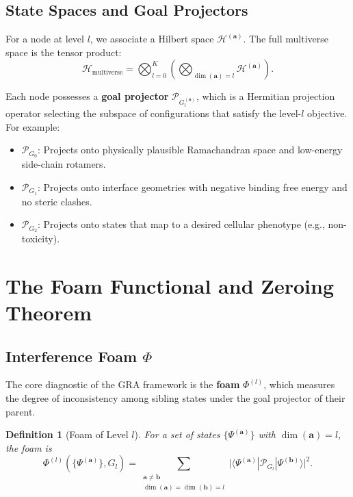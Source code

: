 \documentclass[11pt]{article}
\newtheorem{definition}[theorem]{Definition}
\newcommand{\cP}{\mathcal{P}}
\newcommand{\cH}{\mathcal{H}}
\begin{document}
\subsection{State Spaces and Goal Projectors}

For a node at level \(l\), we associate a Hilbert space \(\cH^{(\mathbf{a})}\). The full multiverse space is the tensor product:
\begin{equation}
\cH_{\text{multiverse}} = \bigotimes_{l=0}^{K} \left( \bigotimes_{\dim(\mathbf{a})=l} \cH^{(\mathbf{a})} \right).
\end{equation}

Each node possesses a \textbf{goal projector} \(\cP_{G_l^{(\mathbf{a})}}\), which is a Hermitian projection operator selecting the subspace of configurations that satisfy the level-\(l\) objective. For example:
\begin{itemize}
    \item \(\cP_{G_0}\): Projects onto physically plausible Ramachandran space and low-energy side-chain rotamers.
    \item \(\cP_{G_1}\): Projects onto interface geometries with negative binding free energy and no steric clashes.
    \item \(\cP_{G_2}\): Projects onto states that map to a desired cellular phenotype (e.g., non-toxicity).
\end{itemize}

\section{The Foam Functional and Zeroing Theorem}

\subsection{Interference Foam \(\Phi\)}

The core diagnostic of the GRA framework is the \textbf{foam} \(\Phi^{(l)}\), which measures the degree of inconsistency among sibling states under the goal projector of their parent.

\begin{definition}[Foam of Level \(l\)]
For a set of states \(\{\Psi^{(\mathbf{a})}\}\) with \(\dim(\mathbf{a})=l\), the foam is
\begin{equation}
\Phi^{(l)}(\{\Psi^{(\mathbf{a})}\}, G_l) = \sum_{\substack{\mathbf{a} \neq \mathbf{b} \\ \dim(\mathbf{a})=\dim(\mathbf{b})=l}} \big| \langle \Psi^{(\mathbf{a})} | \cP_{G_l} | \Psi^{(\mathbf{b})} \rangle \big|^2.
\end{equation}
\end{definition}
\end{document}
